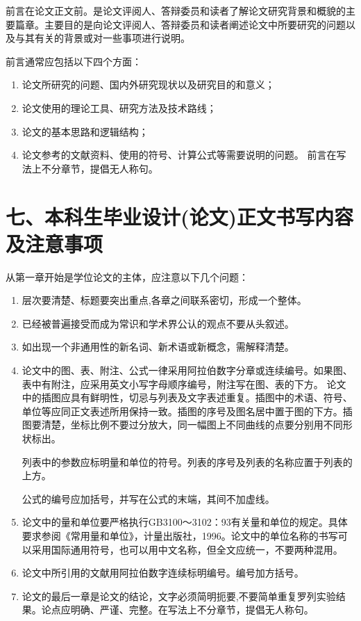 \documentclass{cupb-thesis}
\begin{document}
前言在论文正文前。是论文评阅人、答辩委员和读者了解论文研究背景和概貌的主要篇章。主要目的是向论文评阅人、答辩委员和读者阐述论文中所要研究的问题以及与其有关的背景或对一些事项进行说明。

前言通常应包括以下四个方面：

\begin{enumerate}[label=（\arabic*）]
  \item 论文所研究的问题、国内外研究现状以及研究目的和意义；
  \item 论文使用的理论工具、研究方法及技术路线；
  \item 论文的基本思路和逻辑结构；
  \item 论文参考的文献资料、使用的符号、计算公式等需要说明的问题。
前言在写法上不分章节，提倡无人称句。

\end{enumerate}
\section{七、本科生毕业设计(论文)正文书写内容及注意事项}

从第一章开始是学位论文的主体，应注意以下几个问题：

\begin{enumerate}[label=\arabic*.]
  \item 层次要清楚、标题要突出重点,各章之间联系密切，形成一个整体。
  \item 已经被普遍接受而成为常识和学术界公认的观点不要从头叙述。
  \item 如出现一个非通用性的新名词、新术语或新概念，需解释清楚。
  \item 论文中的图、表、附注、公式一律采用阿拉伯数字分章或连续编号。如果图、表中有附注，应采用英文小写字母顺序编号，附注写在图、表的下方。
论文中的插图应具有鲜明性，切忌与列表及文字表述重复。插图中的术语、符号、单位等应同正文表述所用保持一致。插图的序号及图名居中置于图的下方。插图要清楚，坐标比例不要过分放大，同一幅图上不同曲线的点要分别用不同形状标出。

列表中的参数应标明量和单位的符号。列表的序号及列表的名称应置于列表的上方。

公式的编号应加括号，并写在公式的末端，其间不加虚线。

  \item 论文中的量和单位要严格执行GB3100～3102：93有关量和单位的规定。具体要求参阅《常用量和单位》，计量出版社，1996。论文中的单位名称的书写可以采用国际通用符号，也可以用中文名称，但全文应统一，不要两种混用。
  \item 论文中所引用的文献用阿拉伯数字连续标明编号。编号加方括号。
  \item 论文的最后一章是论文的结论，文字必须简明扼要,不要简单重复罗列实验结果。论点应明确、严谨、完整。在写法上不分章节，提倡无人称句。
\end{enumerate}
\end{document}
